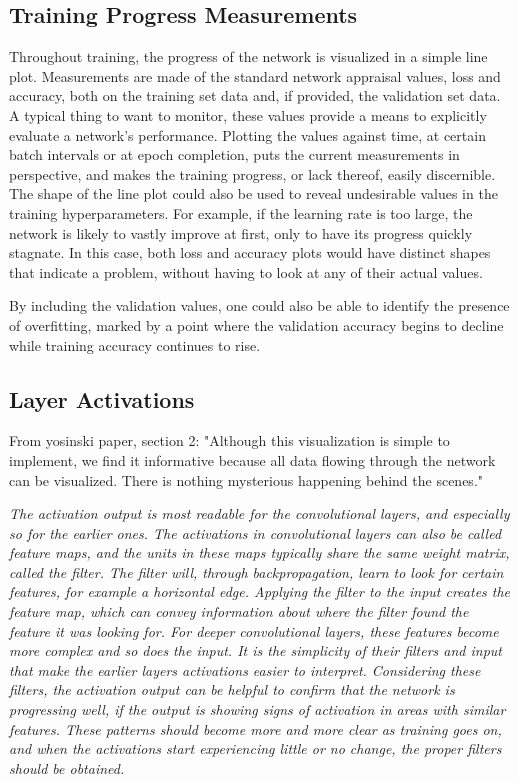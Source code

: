 \subsection{Training Progress Measurements}

Throughout training, the progress of the network is visualized in a simple line plot. Measurements are made of the standard network appraisal values, loss and accuracy, both on the training set data and, if provided, the validation set data. A typical thing to want to monitor, these values provide a means to explicitly evaluate a network's performance. Plotting the values against time, at certain batch intervals or at epoch completion, puts the current measurements in perspective, and makes the training progress, or lack thereof, easily discernible. The shape of the line plot could also be used to reveal undesirable values in the training hyperparameters. For example, if the learning rate is too large, the network is likely to vastly improve at first, only to have its progress quickly stagnate. In this case, both loss and accuracy plots would have distinct shapes that indicate a problem, without having to look at any of their actual values.

By including the validation values, one could also be able to identify the presence of overfitting, marked by a point where the validation accuracy begins to decline while training accuracy continues to rise.

\subsection{Layer Activations}

From yosinski paper, section 2: "Although this visualization is simple to implement, we find
it informative because all data flowing through the network can be visualized. There is nothing mysterious happening behind the scenes."

\textit{The activation output is most readable for the convolutional layers, and especially so for the earlier ones. The activations in convolutional layers can also be called feature maps, and the units in these maps typically share the same weight matrix, called the filter. The filter will, through backpropagation, learn to look for certain features, for example a horizontal edge. Applying the filter to the input creates the feature map, which can convey information about where the filter found the feature it was looking for. For deeper convolutional layers, these features become more complex and so does the input. It is the simplicity of their filters and input that make the earlier layers activations easier to interpret. Considering these filters, the activation output can be helpful to confirm that the network is progressing well, if the output is showing signs of activation in areas with similar features. These patterns should become more and more clear as training goes on, and when the activations start experiencing little or no change, the proper filters should be obtained.} \\

